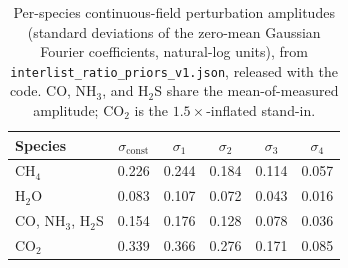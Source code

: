 \documentclass{article}
\begin{document}
\begin{table}[h]
\centering
\caption{Per-species continuous-field perturbation amplitudes (standard
deviations of the zero-mean Gaussian Fourier coefficients, natural-log units),
from \texttt{interlist\_ratio\_priors\_v1.json}, released with the code. CO,
NH$_3$, and H$_2$S share the mean-of-measured amplitude; CO$_2$ is the
$1.5\times$-inflated stand-in.}
\label{tab:opamp}
\begin{tabular}{lccccc}
\toprule
Species & $\sigma_{\mathrm{const}}$ & $\sigma_1$ & $\sigma_2$ & $\sigma_3$ & $\sigma_4$ \\
\midrule
CH$_4$          & 0.226 & 0.244 & 0.184 & 0.114 & 0.057 \\
H$_2$O          & 0.083 & 0.107 & 0.072 & 0.043 & 0.016 \\
CO, NH$_3$, H$_2$S & 0.154 & 0.176 & 0.128 & 0.078 & 0.036 \\
CO$_2$          & 0.339 & 0.366 & 0.276 & 0.171 & 0.085 \\
\bottomrule
\end{tabular}
\end{table}
\end{document}
